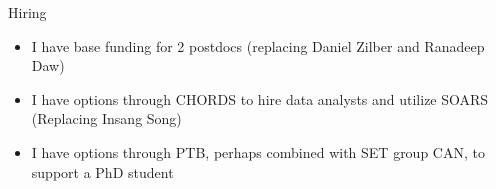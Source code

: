 \documentclass[
  ignorenonframetext,
]{beamer}
\providecommand{\tightlist}{%
  \setlength{\itemsep}{0pt}\setlength{\parskip}{0pt}}\usepackage{longtable,booktabs,array}
\begin{document}
\begin{frame}{Hiring}
\label{hiring}
\begin{itemize}
\tightlist
\item
  I have base funding for 2 postdocs (replacing Daniel Zilber and
  Ranadeep Daw)
\item
  I have options through CHORDS to hire data analysts and utilize SOARS
  (Replacing Insang Song)
\item
  I have options through PTB, perhaps combined with SET group CAN, to
  support a PhD student
\end{itemize}
\end{frame}
\end{document}
